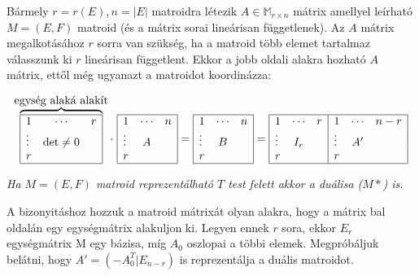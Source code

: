 Bármely $r=r(E), n=|E|$ matroidra létezik $A \in \mathbb{M}_{r\times n}$ mátrix
amellyel leírható $M=(E,F)$ matroid (és a mátrix sorai lineárisan függetlenek).
Az $A$ mátrix megalkotásához $r$ sorra van szükség, ha a matroid több elemet
tartalmaz válasszunk ki $r$ lineárisan függetlent. Ekkor a jobb oldali alakra
hozható $A$ mátrix, ettől még ugyanazt a matroidot koordinázza:

\[
	\overbrace{
		\begin{array}{|lcr|}
			\hline
			1      & \cdots            & r \\
			\vdots & \mbox{det} \neq 0 &   \\
			r      &                   &   \\
			\hline
		\end{array}}^{\mbox{egység alaká alakít}}
	\cdot~
	\begin{array}{|lcr|}
		\hline
		1      & \cdots & n \\
		\vdots & A      &   \\
		r      &        &   \\
		\hline
	\end{array}
	=
	\begin{array}{|lcr|}
		\hline
		1      & \cdots & n \\
		\vdots & B      &   \\
		r      &        &   \\
		\hline
	\end{array}
	=
	\begin{array}{|lcr|lcr|}
		\hline
		1      & \cdots & r & 1      & \cdots & n-r \\
		\vdots & I_r    &   & \vdots & A'     &     \\
		r      &        &   & r      &        &     \\
		\hline
	\end{array}
\]

\emph{Ha $M=(E,F)$ matroid reprezentálható $T$ test felett akkor a duálisa ($M*$) is.}

A bizonyitáshoz hozzuk a matroid mátrixát olyan alakra, hogy a mátrix bal
oldalán egy egységmátrix alakuljon ki. Legyen ennek $r$ sora, ekkor $E_r$ egységmátrix
M egy bázisa, míg $A_0$ oszlopai a többi elemek. Megpróbáljuk belátni, hogy $A'=(-A_0^T|E_{n-r})$
is reprezentálja a duális matroidot.

